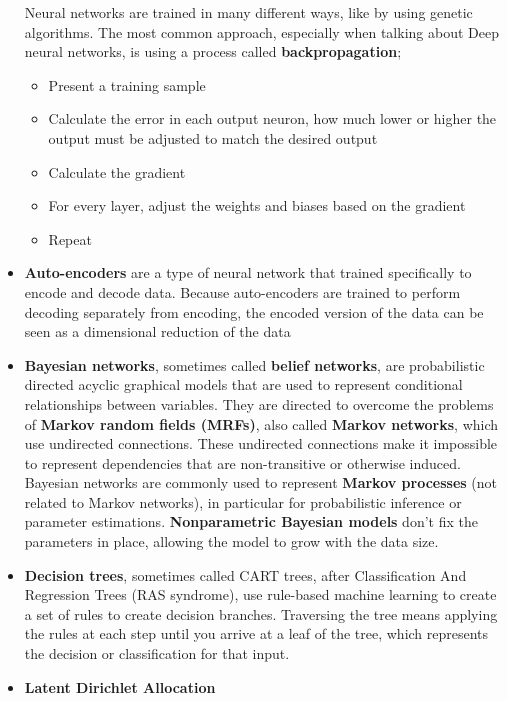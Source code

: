 \begin{itemize}
\begin{itemize}
		\end{itemize}
		Neural networks are trained in many different ways, like by using genetic algorithms. The most common approach, especially when talking about Deep neural networks, is using a process called \textbf{backpropagation};
		\begin{itemize}
			\item Present a training sample
			\item Calculate the error in each output neuron, how much lower or higher the output must be adjusted to match the desired output
			\item Calculate the gradient
			\item For every layer, adjust the weights and biases based on the gradient
			\item Repeat
		\end{itemize}
	\item \textbf{Auto-encoders}
		are a type of neural network that trained specifically to encode and decode data. Because auto-encoders are trained to perform decoding separately from encoding, the encoded version of the data can be seen as a dimensional reduction of the data
	\item \textbf{Bayesian networks}, 
		sometimes called \textbf{belief networks}, are probabilistic directed acyclic graphical models\cite{Wain08}\cite{Kol09}\cite{Xin16} that are used to represent conditional relationships between variables. They are directed to overcome the problems of \textbf{Markov random
		fields (MRFs)}, also called \textbf{Markov networks}, which use undirected connections. These undirected connections make it impossible to represent dependencies that are non-transitive or otherwise induced. Bayesian networks are commonly used to represent \textbf{Markov processes} (not related to Markov networks), in particular for probabilistic inference or parameter estimations.
		\textbf{Nonparametric Bayesian models}\cite{Grif05}\cite{Teh06} don't fix the parameters in place, allowing the model to grow with the data size.
	\item \textbf{Decision trees},
		sometimes called CART trees, after Classification And Regression Trees (RAS syndrome), use rule-based machine learning to create a set of rules to create decision branches. Traversing the tree means applying the rules at each step until you arrive at a leaf of the tree, which represents the decision or classification for that input.
	\item \textbf{Latent Dirichlet Allocation}\cite{Blei03}

\end{itemize}
